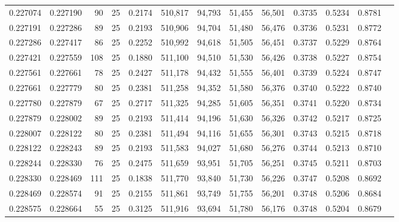 \begin{tabular}{rrrrrrrrrrrrr}
0.227074 & 0.227190 &    90 &  25 &                                     0.2174 & 510,817 &  94,793 &  51,455 &  56,501 & 0.3735 & 0.5234 & 0.8781 \\
0.227191 & 0.227286 &    89 &  25 &                                     0.2193 & 510,906 &  94,704 &  51,480 &  56,476 & 0.3736 & 0.5231 & 0.8772 \\
0.227286 & 0.227417 &    86 &  25 &                                     0.2252 & 510,992 &  94,618 &  51,505 &  56,451 & 0.3737 & 0.5229 & 0.8764 \\
0.227421 & 0.227559 &   108 &  25 &                                     0.1880 & 511,100 &  94,510 &  51,530 &  56,426 & 0.3738 & 0.5227 & 0.8754 \\
0.227561 & 0.227661 &    78 &  25 &                                     0.2427 & 511,178 &  94,432 &  51,555 &  56,401 & 0.3739 & 0.5224 & 0.8747 \\
0.227661 & 0.227779 &    80 &  25 &                                     0.2381 & 511,258 &  94,352 &  51,580 &  56,376 & 0.3740 & 0.5222 & 0.8740 \\
0.227780 & 0.227879 &    67 &  25 &                                     0.2717 & 511,325 &  94,285 &  51,605 &  56,351 & 0.3741 & 0.5220 & 0.8734 \\
0.227879 & 0.228002 &    89 &  25 &                                     0.2193 & 511,414 &  94,196 &  51,630 &  56,326 & 0.3742 & 0.5217 & 0.8725 \\
0.228007 & 0.228122 &    80 &  25 &                                     0.2381 & 511,494 &  94,116 &  51,655 &  56,301 & 0.3743 & 0.5215 & 0.8718 \\
0.228122 & 0.228243 &    89 &  25 &                                     0.2193 & 511,583 &  94,027 &  51,680 &  56,276 & 0.3744 & 0.5213 & 0.8710 \\
0.228244 & 0.228330 &    76 &  25 &                                     0.2475 & 511,659 &  93,951 &  51,705 &  56,251 & 0.3745 & 0.5211 & 0.8703 \\
0.228330 & 0.228469 &   111 &  25 &                                     0.1838 & 511,770 &  93,840 &  51,730 &  56,226 & 0.3747 & 0.5208 & 0.8692 \\
0.228469 & 0.228574 &    91 &  25 &                                     0.2155 & 511,861 &  93,749 &  51,755 &  56,201 & 0.3748 & 0.5206 & 0.8684 \\
0.228575 & 0.228664 &    55 &  25 &                                     0.3125 & 511,916 &  93,694 &  51,780 &  56,176 & 0.3748 & 0.5204 & 0.8679 \\

\end{tabular}
